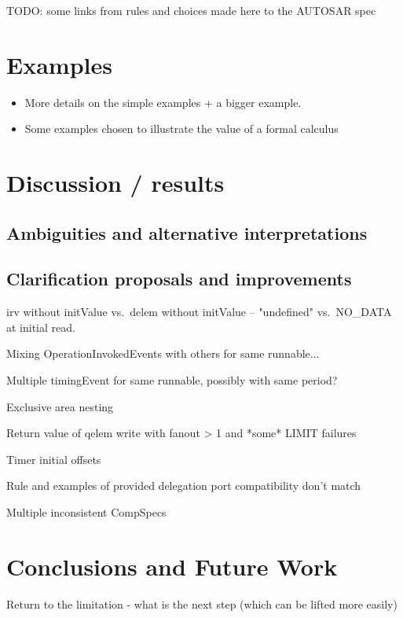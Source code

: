 \documentclass[twocolumn]{article}
\begin{document}
TODO: some links from rules and choices made here to the AUTOSAR spec

\section{Examples}
\label{sec:Examples}

\begin{itemize}
\item More details on the simple examples + a bigger example.
\item Some examples chosen to illustrate the value of a formal calculus
\end{itemize}

\section{Discussion / results}
\label{sec:Disc}

\subsection{Ambiguities and alternative interpretations}
\label{sec:DiscAmb}

\subsection{Clarification proposals and improvements}
\label{sec:DiscImp}

irv without initValue vs.\ delem without initValue -- "undefined" vs.\ NO\_DATA at initial read.

Mixing OperationInvokedEvents with others for same runnable...

Multiple timingEvent for same runnable, possibly with same period?

Exclusive area nesting

Return value of qelem write with fanout > 1 and *some* LIMIT failures

Timer initial offsets

Rule and examples of provided delegation port compatibility don't match

Multiple inconsistent CompSpecs


\section{Conclusions and Future Work}
\label{sec:Conc}

Return to the limitation - what is the next step (which can be lifted more easily)
\end{document}
